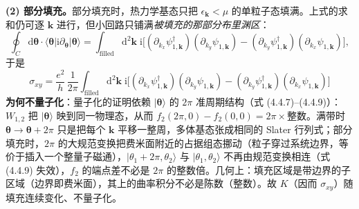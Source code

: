 \textbf{(2) 部分填充。}部分填充时，热力学基态只把 $\epsilon_{\pmb k}<\mu$ 的单粒子态填满。上式的求和仍可逐 $\pmb k$ 进行，但小回路只铺满\emph{被填充的那部分布里渊区}：
\begin{equation*}
\oint_C\mathrm{d}\pmb\theta\cdot\langle\pmb\theta|\mathrm{i}\partial_{\pmb\theta}|\pmb\theta\rangle
=\int_{\text{filled}}\mathrm{d}^2\pmb k\;
\mathrm{i}\big[(\partial_{k_x}\psi^\dagger_{1,\pmb k})(\partial_{k_y}\psi_{1,\pmb k})-(\partial_{k_y}\psi^\dagger_{1,\pmb k})(\partial_{k_x}\psi_{1,\pmb k})\big],
\end{equation*}
于是
\begin{equation*}
\boxed{\;\sigma_{xy}=\frac{e^2}{h}\,\frac{1}{2\pi}\int_{\text{filled}}\mathrm{d}^2\pmb k\;
\mathrm{i}\big[(\partial_{k_x}\psi^\dagger_{1,\pmb k})(\partial_{k_y}\psi_{1,\pmb k})-(\partial_{k_y}\psi^\dagger_{1,\pmb k})(\partial_{k_x}\psi_{1,\pmb k})\big]\;}
\end{equation*}
\textbf{为何不量子化}：量子化的证明依赖 $|\pmb\theta\rangle$ 的 $2\pi$ 准周期结构（式 (4.4.7)–(4.4.9)）：$W_{1,2}$ 把 $|\pmb\theta\rangle$ 映到同一物理态，从而 $f_2(2\pi,0)-f_2(0,0)=2\pi\times$整数。满带时 $\pmb\theta\to\pmb\theta+2\pi$ 只是把每个 $\pmb k$ 平移一整周，多体基态张成相同的 Slater 行列式；部分填充时，$2\pi$ 的大规范变换把费米面附近的占据组态挪动（粒子穿过系统边界，等价于插入一个整量子磁通），$|\theta_1+2\pi,\theta_2\rangle$ 与 $|\theta_1,\theta_2\rangle$ 不再由规范变换相连（式 (4.4.9) 失效），$f_2$ 的端点差不必是 $2\pi$ 的整数倍。几何上：填充区域是带边界的子区域（边界即费米面），其上的曲率积分不必是陈数（整数）。故 $K$（因而 $\sigma_{xy}$）随填充连续变化、不量子化。

